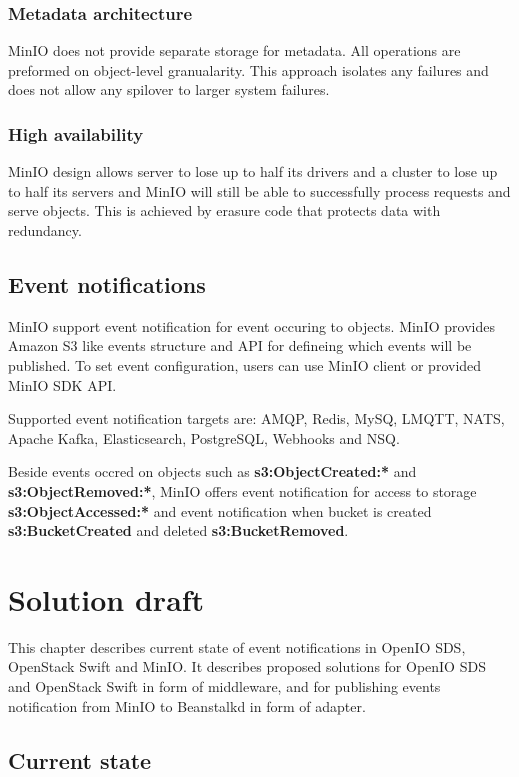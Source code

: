     \subsection*{Metadata architecture}
    MinIO does not provide separate storage for metadata. All operations are preformed on object-level granualarity. This approach isolates any failures and does not allow any spilover to larger system failures\cite{minioIntel}.

    \subsection*{High availability}
    MinIO design allows server to lose up to half its drivers and a cluster to lose up to half its servers and MinIO will still be able to successfully process requests and serve objects. This is achieved by erasure code that protects data with redundancy\cite{minioIntel}.

\section{Event notifications}
    MinIO support event notification for event occuring to objects. MinIO provides Amazon S3 like events structure and API for defineing which events will be published. To set event configuration, users can use MinIO client or provided MinIO SDK API.

    Supported event notification targets are: AMQP, Redis, MySQ, LMQTT, NATS, Apache Kafka, Elasticsearch, PostgreSQL, Webhooks and NSQ.

    Beside events occred on objects such as \textbf{s3:ObjectCreated:*} and \textbf{s3:ObjectRemoved:*}, MinIO offers event notification for access to storage \textbf{s3:ObjectAccessed:*} and event notification when bucket is created \textbf{s3:BucketCreated} and deleted \textbf{s3:BucketRemoved}.


\chapter{Solution draft}
    This chapter describes current state of event notifications in OpenIO SDS, OpenStack Swift and MinIO. It describes proposed solutions for OpenIO SDS and OpenStack Swift in form of middleware, and for publishing events notification from MinIO to Beanstalkd in form of adapter.
\section{Current state}
